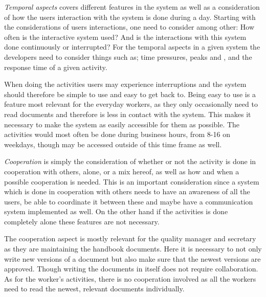 \textit{Temporal aspects} covers different features in the system as well as a consideration of how the users interaction with the system is done during a day.
Starting with the considerations of users interactions, one need to consider among other:
How often is the interactive system used?
And is the interactions with this system done continuously or interrupted?
For the temporal aspects in a given system the developers need to consider things such as; time pressures, peaks and , and the response time of a given activity. \citep{Benyon}

When doing the activities users may experience interruptions and the system should therefore be simple to use and easy to get back to.
Being easy to use is a feature most relevant for the everyday workers, as they only occasionally need to read documents and therefore is less in contact with the system.
This makes it necessary to make the system as easily accessible for them as possible.
The activities would most often be done during business hours, from 8-16 on weekdays, though may be accessed outside of this time frame as well.


\textit{Cooperation} is simply the consideration of whether or not the activity is done in cooperation with others, alone, or a mix hereof, as well as how and when a possible cooperation is needed.
This is an important consideration since a system which is done in cooperation with others needs to have an awareness of all the users, be able to coordinate it between these and maybe have a communication system implemented as well.
On the other hand if the activities is done completely alone these features are not necessary. \citep{Benyon}

The cooperation aspect is mostly relevant for the quality manager and secretary as they are maintaining the handbook documents.
Here it is necessary to not only write new versions of a document but also make sure that the newest versions are approved.
Though writing the documents in itself does not require collaboration.
As for the worker's activities, there is no cooperation involved as all the workers need to read the newest, relevant documents individually.

